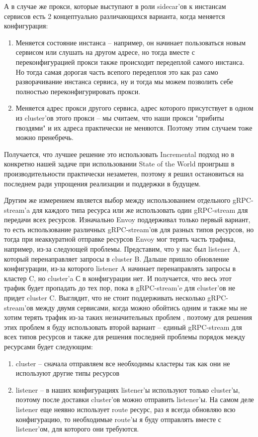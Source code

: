 А в случае же прокси, которые выступают в роли sidecar'ов к инстансам сервисов есть 2 концептуально различающихся варианта, когда меняется конфигурация:
\begin{enumerate}
	\item Меняется состояние инстанса -- например, он начинает пользоваться новым сервисом или слушать на другом адресе, но тогда вместе с переконфигурацией прокси также происходит передеплой самого инстанса. Но тогда самая дорогая часть всепого передеплоя это как раз само разворачивание инстанса сервиса, ну и тогда мы можем позволить себе полностью переконфигурировать прокси.
	\item Меняется адрес прокси другого сервиса, адрес которого присутствует в одном из cluster'ов этого прокси -- мы считаем, что наши прокси "прибиты гвоздями" и их адреса практически не меняются. Поэтому этим случаем тоже можно пренебречь.
\end{enumerate}

Получается, что лучшее решение это использовать Incremental подход но в конкретно нашей задаче при использовании State of the World проигрыш в производительности практически незаметен, поэтому я решил остановиться на последнем ради упрощения реализации и поддержки в будущем.

Другим же измерением является выбор между использованием отдельного gRPC-stream'a для каждого типа ресурса или же использовать один gRPC-stream для передачи всех ресурсов. Изначально Envoy поддерживал только первый вариант, то есть использование различных gRPC-stream'ов для разных типов ресурсов, но тогда при неаккуратной отправке ресурсов Envoy мог терять часть трафика, например, из-за следующей проблемы. Представим, что у нас был listener A, который перенаправляет запросы в cluster B. Дальше пришло обновление конфигурации, из-за которого listener A начинает перенаправлять запросы в кластер C, но cluster'a С в конфигурации нет. И получается, что весь этот трафик будет пропадать до тех пор, пока в gRPC-stream'e для cluster'ов не придет cluster C. Выглядит, что не стоит поддерживать несколько gRPC-stream'ов между двумя сервисами, когда можно обойтись одним и также мы не хотим терять трафик из-за таких незначительных проблем , поэтому для решения этих проблем я буду использовать второй вариант -- единый gRPC-stream для всех типов ресурсов и также для решения последней проблемы порядок между ресурсами будет следующим:
\begin{enumerate}
	\item cluster -- сначала отправляем все необходимы кластеры так как они не используют другие типы ресурсов
	\item listener -- в наших конфигурациях listener'ы используют только cluster'ы, поэтому после доставки cluster'ов можно отправить listener'ы. На самом деле listener еще неявно использует route ресурс, раз я всегда обновляю всю конфигурацию, то необходимые route'ы я буду отправлять вместе с listener'ом, для которого они требуются.
\end{enumerate} 

